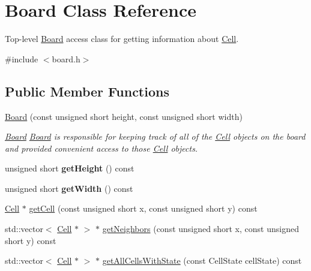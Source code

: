 \hypertarget{class_board}{}\section{Board Class Reference}
\label{class_board}


Top-\/level \hyperlink{class_board}{Board} access class for getting information about \hyperlink{class_cell}{Cell}.  




{\ttfamily \#include $<$board.\+h$>$}

\subsection*{Public Member Functions}
\begin{DoxyCompactItemize}
\item 
\hyperlink{class_board_a872c0c8999c17909cf693df3ce7c78b1}{Board} (const unsigned short height, const unsigned short width)
\begin{DoxyCompactList}\small\item\em \hyperlink{class_board}{Board} \hyperlink{class_board}{Board} is responsible for keeping track of all of the \hyperlink{class_cell}{Cell} objects on the board and provided convenient access to those \hyperlink{class_cell}{Cell} objects. \end{DoxyCompactList}\item 
unsigned short {\bfseries get\+Height} () const \hypertarget{class_board_a6956d7acf362888066765e315b2a9887}{}\label{class_board_a6956d7acf362888066765e315b2a9887}

\item 
unsigned short {\bfseries get\+Width} () const \hypertarget{class_board_a5d27e008e59db3f1a936eebbac0c55d7}{}\label{class_board_a5d27e008e59db3f1a936eebbac0c55d7}

\item 
\hyperlink{class_cell}{Cell} $\ast$ \hyperlink{class_board_ad5c155ecfeec2aa43fa91c511ee5823a}{get\+Cell} (const unsigned short x, const unsigned short y) const 
\item 
std\+::vector$<$ \hyperlink{class_cell}{Cell} $\ast$ $>$ $\ast$ \hyperlink{class_board_a01576a951af1d3a0fb5ebae915ab4e1c}{get\+Neighbors} (const unsigned short x, const unsigned short y) const 
\item 
std\+::vector$<$ \hyperlink{class_cell}{Cell} $\ast$ $>$ $\ast$ \hyperlink{class_board_ad3e2d2c116f0b66293ac8be281875fef}{get\+All\+Cells\+With\+State} (const Cell\+State cell\+State) const 
\end{DoxyCompactItemize}
